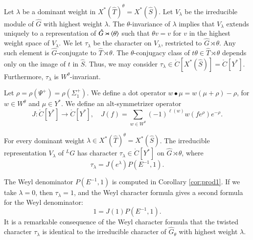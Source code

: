 Let $\lambda$ be a dominant weight in $X^*(\hat T)^\theta = X^*(\hat S)$.  Let $V_\lambda$ be the irreducible module
of $\hat G$ with highest weight $\lambda$.  The $\theta$-invariance of $\lambda$ implies that $V_\lambda$
extends uniquely to a representation of $\hat G \rtimes \langle{\theta}\rangle$ such that $\theta v = v$ for $v$ in the
highest weight space of $V_\lambda$.  We let $\tau_\lambda$ be the character on $V_\lambda$, restricted to $\hat G\rtimes\theta$.  Any such element is $\hat G$-conjugate to $\hat T\rtimes\theta$.
The $\theta$-conjugacy class of $t\theta\in \hat T\rtimes\theta$ 
depends only on the image of $t$ in $\hat S$.  
Thus, we may consider
$\tau_\lambda\in \ring{C}[X^*(\hat S)] =\ring{C}[Y^*]$.  Furthermore, $\tau_\lambda$ is $W^\theta$-invariant.

Let $\rho = \rho(\Psi^+) = \rho(\Sigma^+_1)$.
We define a dot operator $w\bullet \mu = w(\mu+\rho)-\rho$, for $w\in W^\theta$ and $\mu\in Y^*$.
We define an alt-symmetrizer operator
\[
J:\ring{C}[Y^*]\to \ring{C}[Y^*],\quad J(f) = \sum_{w\in W^\theta} (-1)^{\ell(w)} w(f e^\rho) e^{-\rho}.
\]

\begin{theorem}  For every dominant weight $\lambda\in X^*(\hat T)^\theta = X^*(\hat S)$.
The irreducible representation $V_\lambda$ of ${}^LG$ has character $\tau_\lambda\in \ring{C}[Y^*]$ on
$\hat G\rtimes \theta$, where
\[
\tau_\lambda = J(e^\lambda) P(E^{-1},1).
\]
\end{theorem}


The Weyl denominator $P(E^{-1},1)$ is computed in Corollary \ref{cor:prod1}.  
If we take $\lambda=0$, then $\tau_\lambda=1$, and the Weyl character formula gives 
a second formula for the Weyl denominator:
\begin{equation}\label{eqn:wd2}
1= J(1) P(E^{-1},1).
\end{equation}
It is a remarkable consequence
of the Weyl character formula that
the twisted character $\tau_\lambda$ is identical to the irreducible character of 
$\hat G_\theta$ with highest weight $\lambda$.


